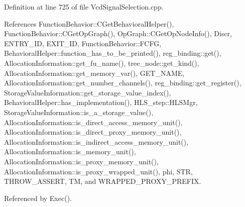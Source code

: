 Definition at line 725 of file Vcd\+Signal\+Selection.\+cpp.



References Function\+Behavior\+::\+C\+Get\+Behavioral\+Helper(), Function\+Behavior\+::\+C\+Get\+Op\+Graph(), Op\+Graph\+::\+C\+Get\+Op\+Node\+Info(), Discr, E\+N\+T\+R\+Y\+\_\+\+ID, E\+X\+I\+T\+\_\+\+ID, Function\+Behavior\+::\+F\+C\+FG, Behavioral\+Helper\+::function\+\_\+has\+\_\+to\+\_\+be\+\_\+printed(), reg\+\_\+binding\+::get(), Allocation\+Information\+::get\+\_\+fu\+\_\+name(), tree\+\_\+node\+::get\+\_\+kind(), Allocation\+Information\+::get\+\_\+memory\+\_\+var(), G\+E\+T\+\_\+\+N\+A\+ME, Allocation\+Information\+::get\+\_\+number\+\_\+channels(), reg\+\_\+binding\+::get\+\_\+register(), Storage\+Value\+Information\+::get\+\_\+storage\+\_\+value\+\_\+index(), Behavioral\+Helper\+::has\+\_\+implementation(), H\+L\+S\+\_\+step\+::\+H\+L\+S\+Mgr, Storage\+Value\+Information\+::is\+\_\+a\+\_\+storage\+\_\+value(), Allocation\+Information\+::is\+\_\+direct\+\_\+access\+\_\+memory\+\_\+unit(), Allocation\+Information\+::is\+\_\+direct\+\_\+proxy\+\_\+memory\+\_\+unit(), Allocation\+Information\+::is\+\_\+indirect\+\_\+access\+\_\+memory\+\_\+unit(), Allocation\+Information\+::is\+\_\+memory\+\_\+unit(), Allocation\+Information\+::is\+\_\+proxy\+\_\+memory\+\_\+unit(), Allocation\+Information\+::is\+\_\+proxy\+\_\+wrapped\+\_\+unit(), phi, S\+TR, T\+H\+R\+O\+W\+\_\+\+A\+S\+S\+E\+RT, TM, and W\+R\+A\+P\+P\+E\+D\+\_\+\+P\+R\+O\+X\+Y\+\_\+\+P\+R\+E\+F\+IX.



Referenced by Exec().

